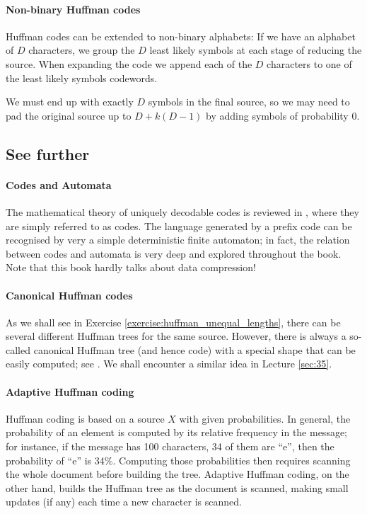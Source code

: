 \documentclass[a4paper, 11pt, openany]{book}
\begin{document}
\paragraph{Non-binary Huffman codes}

Huffman codes can be extended to non-binary alphabets: If we have an alphabet of $D$ characters, we group the $D$ least likely symbols at each stage of reducing the source. When expanding the code we append each of the $D$ characters to one of the least likely symbols codewords.

We must end up with exactly $D$ symbols in the final source, so we may need to pad the original source up to $D+k(D-1)$ by adding symbols of probability $0$.

\subsection{See further}

\paragraph{Codes and Automata} The mathematical theory of uniquely decodable codes is reviewed in \cite{BPR10}, where they are simply referred to as codes. The language generated by a prefix code can be recognised by very a simple deterministic finite automaton; in fact, the relation between codes and automata is very deep and explored throughout the book. Note that this book hardly talks about data compression!

\paragraph{Canonical Huffman codes} As we shall see in Exercise \ref{exercise:huffman_unequal_lengths}, there can be several different Huffman trees for the same source. However, there is always a so-called canonical Huffman tree (and hence code) with a special shape that can be easily computed; see \cite[3.2.2]{Say12}. We shall encounter a similar idea in Lecture \ref{sec:35}.

\paragraph{Adaptive Huffman coding} Huffman coding is based on a source $X$ with given probabilities. In general, the probability of an element is computed by its relative frequency in the message; for instance, if the message has 100 characters, 34 of them are ``e'', then the probability of ``e'' is 34\%. Computing those probabilities then requires scanning the whole document before building the tree. Adaptive Huffman coding, on the other hand, builds the Huffman tree as the document is scanned, making small updates (if any) each time a new character is scanned.
\end{document}
